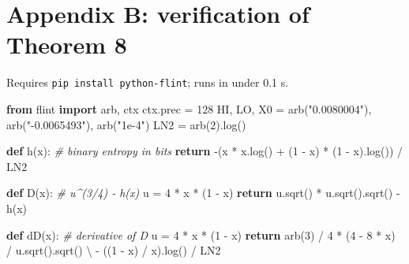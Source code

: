 \documentclass[
  11pt,
]{article}
\newenvironment{Shaded}{}{}
\newcommand{\CommentTok}[1]{\textcolor[rgb]{0.38,0.63,0.69}{\textit{#1}}}
\newcommand{\ControlFlowTok}[1]{\textcolor[rgb]{0.00,0.44,0.13}{\textbf{#1}}}
\newcommand{\DecValTok}[1]{\textcolor[rgb]{0.25,0.63,0.44}{#1}}
\newcommand{\ImportTok}[1]{\textcolor[rgb]{0.00,0.50,0.00}{\textbf{#1}}}
\newcommand{\KeywordTok}[1]{\textcolor[rgb]{0.00,0.44,0.13}{\textbf{#1}}}
\newcommand{\NormalTok}[1]{#1}
\newcommand{\OperatorTok}[1]{\textcolor[rgb]{0.40,0.40,0.40}{#1}}
\newcommand{\StringTok}[1]{\textcolor[rgb]{0.25,0.44,0.63}{#1}}
\begin{document}
\hypertarget{appendix-b-verification-of-theorem-8}{%
\section*{Appendix B: verification of Theorem
8}\label{appendix-b-verification-of-theorem-8}}

Requires \texttt{pip\ install\ python-flint}; runs in under 0.1 s.

\begin{Shaded}
\begin{Highlighting}[]
\ImportTok{from}\NormalTok{ flint }\ImportTok{import}\NormalTok{ arb, ctx}
\NormalTok{ctx.prec }\OperatorTok{=} \DecValTok{128}
\NormalTok{HI, LO, X0 }\OperatorTok{=}\NormalTok{ arb(}\StringTok{"0.0080004"}\NormalTok{), arb(}\StringTok{"{-}0.0065493"}\NormalTok{), arb(}\StringTok{"1e{-}4"}\NormalTok{)}
\NormalTok{LN2 }\OperatorTok{=}\NormalTok{ arb(}\DecValTok{2}\NormalTok{).log()}

\KeywordTok{def}\NormalTok{ h(x):                       }\CommentTok{\# binary entropy in bits}
    \ControlFlowTok{return} \OperatorTok{{-}}\NormalTok{(x }\OperatorTok{*}\NormalTok{ x.log() }\OperatorTok{+}\NormalTok{ (}\DecValTok{1} \OperatorTok{{-}}\NormalTok{ x) }\OperatorTok{*}\NormalTok{ (}\DecValTok{1} \OperatorTok{{-}}\NormalTok{ x).log()) }\OperatorTok{/}\NormalTok{ LN2}

\KeywordTok{def}\NormalTok{ D(x):                       }\CommentTok{\# u\^{}(3/4) {-} h(x)}
\NormalTok{    u }\OperatorTok{=} \DecValTok{4} \OperatorTok{*}\NormalTok{ x }\OperatorTok{*}\NormalTok{ (}\DecValTok{1} \OperatorTok{{-}}\NormalTok{ x)}
    \ControlFlowTok{return}\NormalTok{ u.sqrt() }\OperatorTok{*}\NormalTok{ u.sqrt().sqrt() }\OperatorTok{{-}}\NormalTok{ h(x)}

\KeywordTok{def}\NormalTok{ dD(x):                      }\CommentTok{\# derivative of D}
\NormalTok{    u }\OperatorTok{=} \DecValTok{4} \OperatorTok{*}\NormalTok{ x }\OperatorTok{*}\NormalTok{ (}\DecValTok{1} \OperatorTok{{-}}\NormalTok{ x)}
    \ControlFlowTok{return}\NormalTok{ arb(}\DecValTok{3}\NormalTok{) }\OperatorTok{/} \DecValTok{4} \OperatorTok{*}\NormalTok{ (}\DecValTok{4} \OperatorTok{{-}} \DecValTok{8} \OperatorTok{*}\NormalTok{ x) }\OperatorTok{/}\NormalTok{ u.sqrt().sqrt() }\OperatorTok{\textbackslash{}}
        \OperatorTok{{-}}\NormalTok{ ((}\DecValTok{1} \OperatorTok{{-}}\NormalTok{ x) }\OperatorTok{/}\NormalTok{ x).log() }\OperatorTok{/}\NormalTok{ LN2}


\end{Highlighting}
\end{Shaded}
\end{document}
